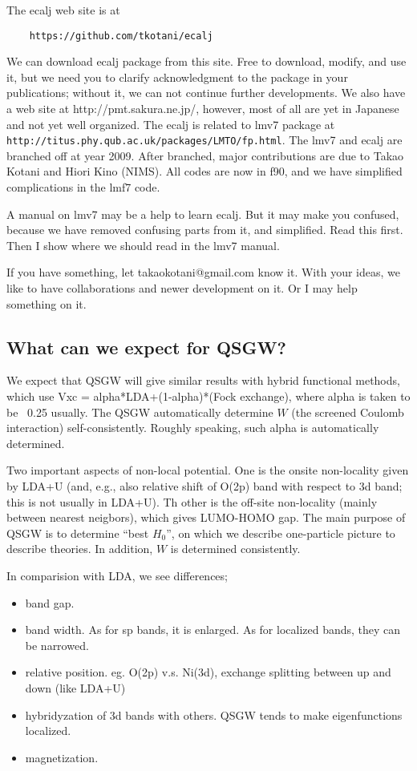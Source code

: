 \documentclass[a4paper,10pt,epsf,fleqn]{article}
\begin{document}
The ecalj web site is at 
\begin{verbatim}
    https://github.com/tkotani/ecalj
\end{verbatim}
We can download ecalj package from this site.
Free to download, modify, and use it, but we need you to clarify 
acknowledgment to the package in your publications; 
without it, we can not continue further developments.
We also have a web site at http://pmt.sakura.ne.jp/, 
however, most of all are yet in Japanese and not yet well organized.
The ecalj is related to lmv7 package at\\
\verb+http://titus.phy.qub.ac.uk/packages/LMTO/fp.html+. 
The lmv7 and ecalj are branched off at year 2009.
After branched, major contributions are due to Takao Kotani and Hiori
Kino (NIMS). All codes are now in f90, and we have simplified 
complications in the lmf7 code. 

A manual on lmv7 may be a help to learn ecalj. 
But it may make you confused, because we have removed confusing
parts from it, and simplified. Read this first. Then I show where we
should read in the lmv7 manual.

If you have something, let takaokotani@gmail.com know it.
With your ideas, we like to have collaborations and newer development on
it. Or I may help something on it.

\subsection{What can we expect for QSGW?}
We expect that QSGW will give similar results with hybrid functional
methods, which use Vxc = alpha*LDA+(1-alpha)*(Fock exchange), 
where alpha is taken to be ~0.25 usually. 
The QSGW automatically determine $W$ 
(the screened Coulomb interaction) self-consistently. 
Roughly speaking, such alpha is automatically determined.

Two important aspects of non-local potential.
One is the onsite non-locality given by LDA+U 
(and, e.g., also relative shift of O(2p) band with respect to 3d band; 
this is not usually in LDA+U). 
Th other is the off-site non-locality (mainly between nearest neigbors),
which gives LUMO-HOMO gap. The main purpose of QSGW is to determine 
``best $H_0$'', on which we describe one-particle picture to describe theories.
In addition, $W$ is determined consistently.

In comparision with LDA, we see differences;
\begin{itemize}
\item
band gap.
\item
band width. As for sp bands, it is enlarged.
As for localized bands, they can be narrowed.
\item
relative position. eg. O(2p) v.s. Ni(3d),
exchange splitting between up and down (like LDA+U)
\item
hybridyzation of 3d bands with others.
QSGW tends to make eigenfunctions localized.
\item
magnetization.
\end{itemize}
\end{document}
